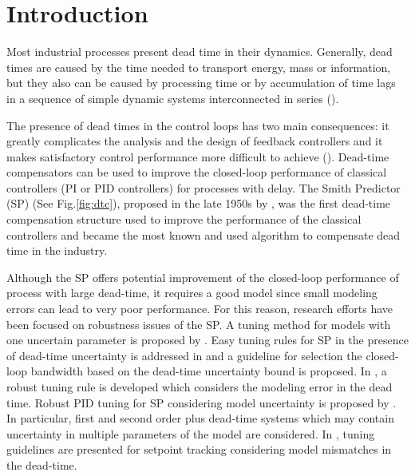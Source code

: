 \documentclass[default]{svmult}
\begin{document}
\section{Introduction}
\label{sec:1}
Most industrial processes present dead time in their dynamics. Generally, dead times are caused by the time needed to transport energy, mass or information, but they also can be caused by processing time or by accumulation of time lags in a sequence of simple dynamic systems interconnected in series (\cite{NC07}).

The presence of dead times in the control loops has two main consequences: it greatly complicates the analysis and the design of feedback controllers  and it makes satisfactory control performance more difficult to achieve (\cite{Pal96}). Dead-time compensators can be used to improve the closed-loop performance of classical controllers (PI or PID controllers) for processes with delay. The Smith Predictor (SP) (See Fig.\ref{fig:dtc}), proposed in the late 1950s by \cite{Smi57}, was the first dead-time compensation structure used to improve the performance of the classical
controllers and became the most known and used algorithm to compensate dead time in the industry.

Although the SP offers potential improvement of the closed-loop performance of process with large dead-time, it requires a good model since small modeling errors can lead to very poor performance. %
For this reason, research efforts have been focused on robustness issues of the SP. A tuning method for models with one uncertain parameter is proposed by \cite{Bro79}.
Easy tuning rules for SP in the presence of dead-time uncertainty is addressed in \cite{SS93} and a guideline for selection the closed-loop bandwidth based on the dead-time uncertainty bound is proposed.
In \cite{PB94}, a robust tuning rule is developed  which considers the modeling error in the dead time.  Robust PID tuning for SP considering model uncertainty is proposed by \cite{LLSL99}. In particular, first and second order plus dead-time systems which may contain uncertainty in multiple parameters of the model are considered. In \cite{MZ00}, tuning guidelines are presented for setpoint tracking considering model mismatches in the dead-time. 
\end{document}
